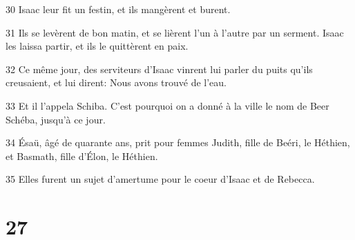 \par 30 Isaac leur fit un festin, et ils mangèrent et burent.
\par 31 Ils se levèrent de bon matin, et se lièrent l'un à l'autre par un serment. Isaac les laissa partir, et ils le quittèrent en paix.
\par 32 Ce même jour, des serviteurs d'Isaac vinrent lui parler du puits qu'ils creusaient, et lui dirent: Nous avons trouvé de l'eau.
\par 33 Et il l'appela Schiba. C'est pourquoi on a donné à la ville le nom de Beer Schéba, jusqu'à ce jour.
\par 34 Ésaü, âgé de quarante ans, prit pour femmes Judith, fille de Beéri, le Héthien, et Basmath, fille d'Élon, le Héthien.
\par 35 Elles furent un sujet d'amertume pour le coeur d'Isaac et de Rebecca.

\chapter{27}

